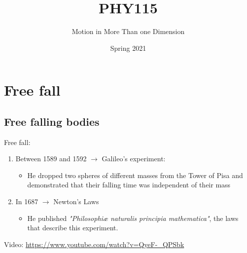 \documentclass[]{beamer}
\title{PHY115}    %
\author{Motion in More Than one Dimension}                 %
\institute{Digipen}      %
\date{Spring 2021}
\begin{document}
\begin{frame}
  \titlepage
\end{frame}

\section[]{}

\begin{frame}
  \tableofcontents
\end{frame}

\section{Free fall}
\subsection{Free falling bodies}

\begin{frame}
    Free fall:
    \vspace{3mm}

\begin{enumerate}
\item Between  1589 and 1592 $\rightarrow$ Galileo's experiment:
      \begin{itemize}
          \item He dropped two spheres of different masses from the Tower 
          of Pisa and  demonstrated that their falling time was independent of their mass
      \end{itemize}
      \pause
      \vspace{3mm}

\item In 1687 $\rightarrow$ Newton's Laws
    \begin{itemize}
        \item He published \textit{"Philosophiæ naturalis principia mathematica"}, the laws that describe this experiment.
    \end{itemize}

\end{enumerate}
 
\vspace{3mm}

    Video: \url{https://www.youtube.com/watch?v=QyeF-_QPSbk}

\end{frame}  
\end{document}
